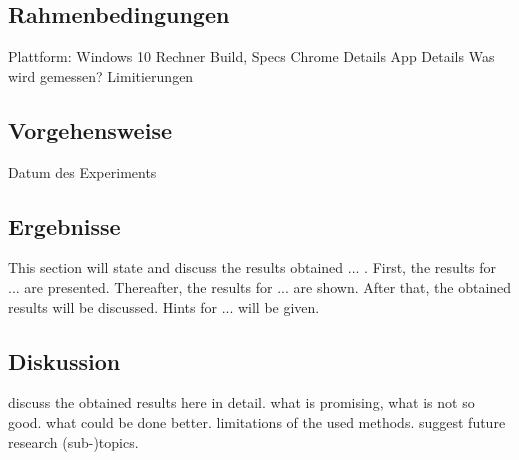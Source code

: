 \subsection{Rahmenbedingungen}
\label{ss:method2}

Plattform: Windows 10 Rechner Build, Specs
Chrome Details
App Details
Was wird gemessen?
Limitierungen


\subsection{Vorgehensweise}
\label{ss:datasource2}

Datum des Experiments


\subsection{Ergebnisse}
\label{ss:results2}

This section will state and discuss the results obtained ... . First, the results for ... are presented. Thereafter, the results for ... are shown. After that, the obtained results will be discussed. Hints for ... will be given.




\subsection{Diskussion}
\label{ss:discussion_details2}

discuss the obtained results here in detail. what is promising, what is not so good. what could be done better. limitations of the used methods. suggest future research (sub-)topics.










